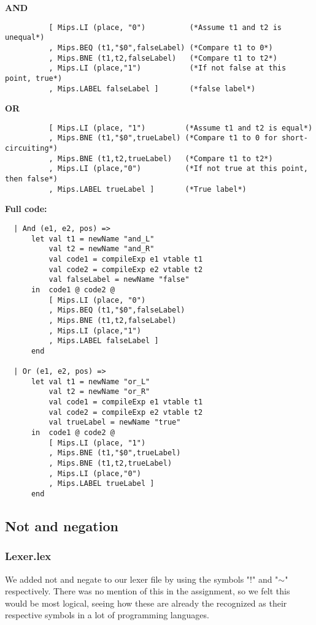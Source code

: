 \documentclass[12pt]{article}
\begin{document}
\textbf{AND}
\begin{verbatim}
          [ Mips.LI (place, "0")          (*Assume t1 and t2 is unequal*)
          , Mips.BEQ (t1,"$0",falseLabel) (*Compare t1 to 0*)
          , Mips.BNE (t1,t2,falseLabel)   (*Compare t1 to t2*)
          , Mips.LI (place,"1")           (*If not false at this point, true*)
          , Mips.LABEL falseLabel ]       (*false label*) 
\end{verbatim}

\textbf{OR}
\begin{verbatim}
          [ Mips.LI (place, "1")         (*Assume t1 and t2 is equal*)
          , Mips.BNE (t1,"$0",trueLabel) (*Compare t1 to 0 for short-circuiting*)
          , Mips.BNE (t1,t2,trueLabel)   (*Compare t1 to t2*)
          , Mips.LI (place,"0")          (*If not true at this point, then false*)
          , Mips.LABEL trueLabel ]       (*True label*)
\end{verbatim}
\clearpage
\textbf{Full code:}
\begin{verbatim}
  | And (e1, e2, pos) =>
      let val t1 = newName "and_L"
          val t2 = newName "and_R"
          val code1 = compileExp e1 vtable t1
          val code2 = compileExp e2 vtable t2
          val falseLabel = newName "false"
      in  code1 @ code2 @
          [ Mips.LI (place, "0")
          , Mips.BEQ (t1,"$0",falseLabel)
          , Mips.BNE (t1,t2,falseLabel)
          , Mips.LI (place,"1") 
          , Mips.LABEL falseLabel ]
      end
      
  | Or (e1, e2, pos) =>
      let val t1 = newName "or_L"
          val t2 = newName "or_R"
          val code1 = compileExp e1 vtable t1
          val code2 = compileExp e2 vtable t2
          val trueLabel = newName "true"
      in  code1 @ code2 @
          [ Mips.LI (place, "1")
          , Mips.BNE (t1,"$0",trueLabel)
          , Mips.BNE (t1,t2,trueLabel)
          , Mips.LI (place,"0")
          , Mips.LABEL trueLabel ]
      end

\end{verbatim}
\subsection{Not and negation}
\subsubsection{Lexer.lex}
We added not and negate to our lexer file by using the symbols "!" and "$\sim$" respectively. There was no mention of this in the assignment, so we felt this would be most logical, seeing how these are already the recognized as their respective symbols in a lot of programming languages.
\end{document}
